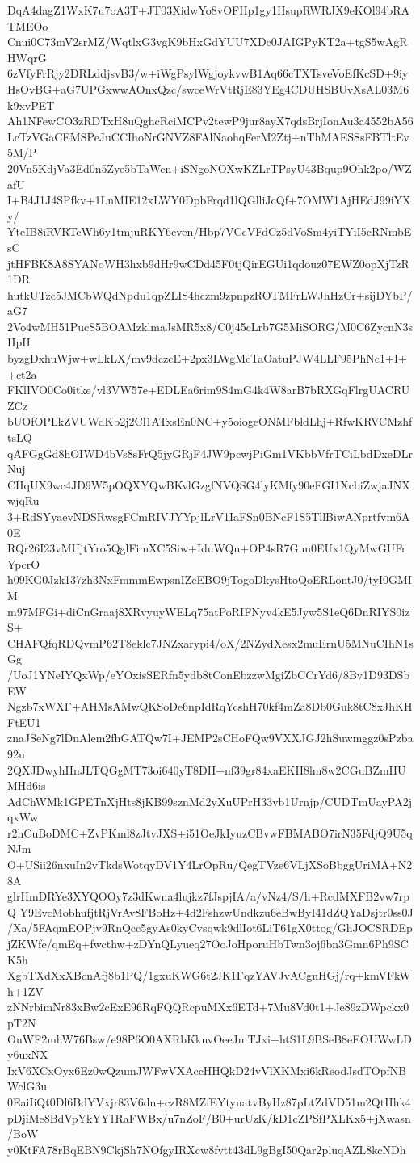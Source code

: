 DqA4dagZ1WxK7u7oA3T+JT03XidwYo8vOFHp1gy1HsupRWRJX9eKOl94bRATMEOo
Cnui0C73mV2srMZ/WqtlxG3vgK9bHxGdYUU7XDc0JAIGPyKT2a+tgS5wAgRHWqrG
6zVfyFrRjy2DRLddjsvB3/w+iWgPsylWgjoykvwB1Aq66cTXTsveVoEfKcSD+9iy
HsOvBG+aG7UPGxwwAOnxQzc/swceWrVtRjE83YEg4CDUHSBUvXsAL03M6k9xvPET
Ah1NFewCO3zRDTxH8uQghcRciMCPv2tewP9jur8ayX7qdsBrjIonAu3a4552bA56
LcTzVGaCEMSPeJuCCIhoNrGNVZ8FAlNaohqFerM2Ztj+nThMAESSsFBTltEv5M/P
20Vn5KdjVa3Ed0n5Zye5bTaWcn+iSNgoNOXwKZLrTPsyU43Bqup9Ohk2po/WZafU
I+B4J1J4SPfkv+1LnMIE12xLWY0DpbFrqd1lQGlliJcQf+7OMW1AjHEdJ99iYXy/
YteIB8iRVRTcWh6y1tmjuRKY6cven/Hbp7VCcVFdCz5dVoSm4yiTYiI5cRNmbEsC
jtHFBK8A8SYANoWH3hxb9dHr9wCDd45F0tjQirEGUi1qdouz07EWZ0opXjTzR1DR
hutkUTzc5JMCbWQdNpdu1qpZLIS4hczm9zpnpzROTMFrLWJhHzCr+sijDYbP/aG7
2Vo4wMH51PucS5BOAMzklmaJsMR5x8/C0j45cLrb7G5MiSORG/M0C6ZycnN3sHpH
byzgDxhuWjw+wLkLX/mv9dczcE+2px3LWgMcTaOatuPJW4LLF95PhNc1+I++ct2a
FKlIVO0Co0itke/vl3VW57e+EDLEa6rim9S4mG4k4W8arB7bRXGqFlrgUACRUZCz
bUOfOPLkZVUWdKb2j2Cl1ATxsEn0NC+y5oiogeONMFbldLhj+RfwKRVCMzhftsLQ
qAFGgGd8hOIWD4bVs8sFrQ5jyGRjF4JW9pcwjPiGm1VKbbVfrTCiLbdDxeDLrNuj
CHqUX9wc4JD9W5pOQXYQwBKvlGzgfNVQSG4lyKMfy90eFGI1XcbiZwjaJNXwjqRu
3+RdSYyaevNDSRwsgFCmRIVJYYpjlLrV1IaFSn0BNcF1S5TllBiwANprtfvm6A0E
RQr26I23vMUjtYro5QglFimXC5Siw+IduWQu+OP4sR7Gun0EUx1QyMwGUFrYpcrO
h09KG0Jzk137zh3NxFmmmEwpsnIZcEBO9jTogoDkysHtoQoERLontJ0/tyI0GMIM
m97MFGi+diCnGraaj8XRvyuyWELq75atPoRIFNyv4kE5Jyw5S1eQ6DnRIYS0izS+
CHAFQfqRDQvmP62T8eklc7JNZxarypi4/oX/2NZydXesx2muErnU5MNuCIhN1sGg
/UoJ1YNeIYQxWp/eYOxisSERfn5ydb8tConEbzzwMgiZbCCrYd6/8Bv1D93DSbEW
Ngzb7xWXF+AHMsAMwQKSoDe6npIdRqYcshH70kf4mZa8Db0Guk8tC8xJhKHFtEU1
znaJSeNg7lDnAlem2fhGATQw7I+JEMP2sCHoFQw9VXXJGJ2hSuwmggz0sPzba92u
2QXJDwyhHnJLTQGgMT73oi640yT8DH+nf39gr84xaEKH8lm8w2CGuBZmHUMHd6is
AdChWMk1GPETnXjHts8jKB99sznMd2yXuUPrH33vb1Urnjp/CUDTmUayPA2jqxWw
r2hCuBoDMC+ZvPKml8zJtvJXS+i51OeJkIyuzCBvwFBMABO7irN35FdjQ9U5qNJm
O+USii26nxuIn2vTkdsWotqyDV1Y4LrOpRu/QegTVze6VLjXSoBbggUriMA+N28A
glrHmDRYe3XYQOOy7z3dKwna4lujkz7fJspjIA/a/vNz4/S/h+RcdMXFB2vw7rpQ
Y9EvcMobhufjtRjVrAv8FBoHz+4d2FshzwUndkzu6eBwByI41dZQYaDsjtr0ss0J
/Xa/5FAqmEOPjv9RnQcc5gyAs0kyCvsqwk9dlIot6LiT61gX0ttog/GhJOCSRDEp
jZKWfe/qmEq+fwcthw+zDYnQLyueq27OoJoHporuHbTwn3oj6bn3Gmn6Ph9SCK5h
XgbTXdXxXBcnAfj8b1PQ/1gxuKWG6t2JK1FqzYAVJvACgnHGj/rq+kmVFkWh+1ZV
zNNrbimNr83xBw2cExE96RqFQQRcpuMXx6ETd+7Mu8Vd0t1+Je89zDWpckx0pT2N
OuWF2mhW76Bsw/e98P6O0AXRbKknvOeeJmTJxi+htS1L9BSeB8eEOUWwLDy6uxNX
IxV6XCxOyx6Ez0wQzumJWFwVXAccHHQkD24vVlXKMxi6kReodJsdTOpfNBWclG3u
0EaiIiQt0Dl6BdYVxjr83V6dn+czR8MZfEYtyuatvByHz87pLtZdVD51m2QtHhk4
pDjiMe8BdVpYkYY1RaFWBx/u7nZoF/B0+urUzK/kD1cZPSfPXLKx5+jXwasn/BoW
y0KtFA78rBqEBN9CkjSh7NOfgyIRXcw8fvtt43dL9gBgI50Qar2pluqAZL8kcNDh
